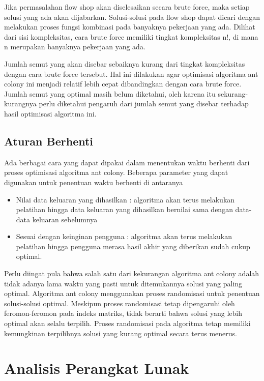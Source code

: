 	Jika permasalahan flow shop akan diselesaikan secara brute force, maka setiap solusi
	yang ada akan dijabarkan. Solusi-solusi pada flow shop dapat dicari dengan melakukan
	proses fungsi kombinasi pada banyaknya pekerjaan yang ada. Dilihat dari sisi kompleksitas, cara
	brute force memiliki tingkat kompleksitas n!, di mana n merupakan banyaknya pekerjaan yang ada.
	
	Jumlah semut yang akan disebar sebaiknya kurang dari tingkat kompleksitas dengan cara brute
	force tersebut. Hal ini dilakukan agar optimisasi algoritma ant colony ini menjadi relatif lebih cepat
	dibandingkan dengan cara brute force. Jumlah semut yang optimal masih belum diketahui, oleh
	karena itu sekurang-kurangnya perlu diketahui pengaruh dari jumlah semut yang disebar terhadap
	hasil optimisasi algoritma ini.
	
	
	\subsection{Aturan Berhenti}
	
	Ada berbagai cara yang dapat dipakai dalam menentukan waktu berhenti dari proses optimisasi
	algoritma ant colony. Beberapa parameter yang dapat digunakan untuk penentuan waktu berhenti
	di antaranya
	\begin{itemize}
		\item Nilai data keluaran yang dihasilkan : algoritma akan terus melakukan pelatihan hingga data
		keluaran yang dihasilkan bernilai sama dengan data-data keluaran sebelumnya
		\item Sesuai dengan keinginan pengguna : algoritma akan terus melakukan pelatihan hingga pengguna
		merasa hasil akhir yang diberikan sudah cukup optimal.
	\end{itemize}
	Perlu diingat pula bahwa salah satu dari kekurangan algoritma ant colony adalah tidak adanya
	lama waktu yang pasti untuk ditemukannya solusi yang paling optimal. Algoritma ant colony
	menggunakan proses randomisasi untuk penentuan solusi-solusi optimal. Meskipun proses randomisasi
	tetap dipengaruhi oleh feromon-feromon pada indeks matriks, tidak berarti bahwa solusi yang
	lebih optimal akan selalu terpilih. Proses randomisasi pada algoritma tetap memiliki kemungkinan
	terpilihnya solusi yang kurang optimal secara terus menerus.
	
	\section{Analisis Perangkat Lunak}
	
